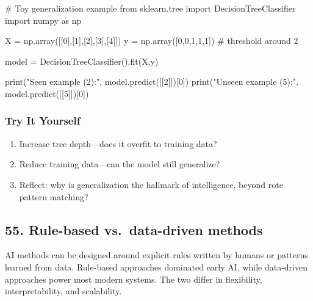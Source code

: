 \documentclass[
  letterpaper,
  DIV=11,
  numbers=noendperiod]{scrreprt}
\newenvironment{Shaded}{\begin{snugshade}}{\end{snugshade}}
\newcommand{\BuiltInTok}[1]{\textcolor[rgb]{0.00,0.23,0.31}{#1}}
\newcommand{\CommentTok}[1]{\textcolor[rgb]{0.37,0.37,0.37}{#1}}
\newcommand{\DecValTok}[1]{\textcolor[rgb]{0.68,0.00,0.00}{#1}}
\newcommand{\ImportTok}[1]{\textcolor[rgb]{0.00,0.46,0.62}{#1}}
\newcommand{\NormalTok}[1]{\textcolor[rgb]{0.00,0.23,0.31}{#1}}
\newcommand{\OperatorTok}[1]{\textcolor[rgb]{0.37,0.37,0.37}{#1}}
\newcommand{\StringTok}[1]{\textcolor[rgb]{0.13,0.47,0.30}{#1}}
\providecommand{\tightlist}{%
  \setlength{\itemsep}{0pt}\setlength{\parskip}{0pt}}
\begin{document}
\begin{Shaded}
\begin{Highlighting}[]
\CommentTok{\# Toy generalization example}
\ImportTok{from}\NormalTok{ sklearn.tree }\ImportTok{import}\NormalTok{ DecisionTreeClassifier}
\ImportTok{import}\NormalTok{ numpy }\ImportTok{as}\NormalTok{ np}

\NormalTok{X }\OperatorTok{=}\NormalTok{ np.array([[}\DecValTok{0}\NormalTok{],[}\DecValTok{1}\NormalTok{],[}\DecValTok{2}\NormalTok{],[}\DecValTok{3}\NormalTok{],[}\DecValTok{4}\NormalTok{]])}
\NormalTok{y }\OperatorTok{=}\NormalTok{ np.array([}\DecValTok{0}\NormalTok{,}\DecValTok{0}\NormalTok{,}\DecValTok{1}\NormalTok{,}\DecValTok{1}\NormalTok{,}\DecValTok{1}\NormalTok{])  }\CommentTok{\# threshold around 2}

\NormalTok{model }\OperatorTok{=}\NormalTok{ DecisionTreeClassifier().fit(X,y)}

\BuiltInTok{print}\NormalTok{(}\StringTok{"Seen example (2):"}\NormalTok{, model.predict([[}\DecValTok{2}\NormalTok{]])[}\DecValTok{0}\NormalTok{])}
\BuiltInTok{print}\NormalTok{(}\StringTok{"Unseen example (5):"}\NormalTok{, model.predict([[}\DecValTok{5}\NormalTok{]])[}\DecValTok{0}\NormalTok{])}
\end{Highlighting}
\end{Shaded}

\subsubsection{Try It Yourself}\label{try-it-yourself-53}

\begin{enumerate}
\def\labelenumi{\arabic{enumi}.}
\tightlist
\item
  Increase tree depth---does it overfit to training data?
\item
  Reduce training data---can the model still generalize?
\item
  Reflect: why is generalization the hallmark of intelligence, beyond
  rote pattern matching?
\end{enumerate}

\subsection{55. Rule-based vs.~data-driven
methods}\label{rule-based-vs.-data-driven-methods}

AI methods can be designed around explicit rules written by humans or
patterns learned from data. Rule-based approaches dominated early AI,
while data-driven approaches power most modern systems. The two differ
in flexibility, interpretability, and scalability.
\end{document}
